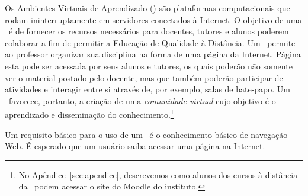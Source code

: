 Os Ambientes Virtuais de Aprendizado (\avas) s{\~ a}o plataformas computacionais que rodam ininterruptamente em servidores 
conectados {\` a} Internet. O objetivo de uma \ava\ {\' e} de fornecer os recursos necess{\' a}rios para docentes, tutores 
e alunos poderem colaborar a fim de permitir a Educa{\c c}{\~ a}o de Qualidade {\` a} Dist{\^ a}ncia. Um \ava\ permite ao 
professor organizar sua disciplina na forma
de uma p{\' a}gina da Internet. P{\' a}gina esta pode ser acessada por seus alunos e tutores, os quais poder{\~ a}o n{\~ a}o somente ver o 
material postado pelo docente, mas que tamb{\' e}m poder{\~ a}o participar de atividades e interagir entre si atrav{\' e}s de, 
por exemplo, salas de bate-papo. Um \ava\ favorece, portanto, a cria{\c c}{\~ a}o de uma \emph{comunidade virtual} cujo objetivo 
{\' e} o aprendizado e dissemina{\c c}{\~ a}o do conhecimento.\footnote{No Ap{\^ e}ndice~\ref{sec:apendice}, 
descrevemos como alunos dos cursos {\` a} dist{\^ a}ncia da \ufpb\ podem acessar o site do Moodle do instituto.}

Um requisito b{\' a}sico para o uso de um \ava\ {\' e} o conhecimento b{\' a}sico de navega{\c c}{\~ a}o Web. É esperado que um usu{\' a}rio 
saiba acessar uma p{\' a}gina na Internet. 

